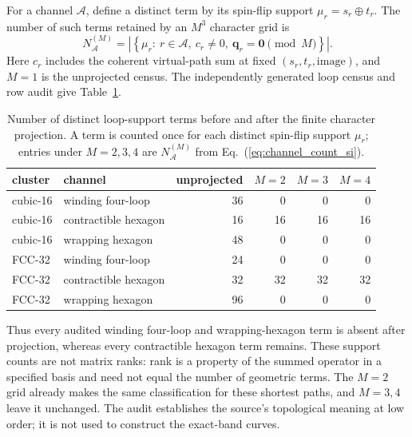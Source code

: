 \documentclass[aps,prl,onecolumn,amsmath,amssymb]{revtex4-2}
\newcommand{\bq}{\bm q}
\begin{document}
For a channel $\mathcal A$, define a distinct term by its spin-flip support
$\mu_r=s_r\mathbin\oplus t_r$.  The number of such terms retained by an
$M^3$ character grid is
\begin{equation}
 N_{\mathcal A}^{(M)}=
 \left|\left\{\mu_r:\ r\in\mathcal A,\ c_r\ne0,\
 \bq_r=\bm0\pmod M\right\}\right|.
\label{eq:channel_count_si}
\end{equation}
Here $c_r$ includes the coherent virtual-path sum at fixed
$(s_r,t_r,\text{image})$, and $M=1$ is the unprojected census.  The
independently generated loop census and row audit give
Table~\ref{tab:path_retention}.
\begin{table}[htbp]
\caption{Number of distinct loop-support terms before and after the finite
character projection.  A term is counted once for each distinct spin-flip
support $\mu_r$; entries under $M=2,3,4$ are $N_{\mathcal A}^{(M)}$ from
Eq.~(\ref{eq:channel_count_si}).}
\label{tab:path_retention}
\centering
\begin{tabular}{llrrrr}
\toprule
cluster & channel & unprojected & $M=2$ & $M=3$ & $M=4$\\
\midrule
cubic-16 & winding four-loop & 36 & 0 & 0 & 0\\
cubic-16 & contractible hexagon & 16 & 16 & 16 & 16\\
cubic-16 & wrapping hexagon & 48 & 0 & 0 & 0\\
FCC-32 & winding four-loop & 24 & 0 & 0 & 0\\
FCC-32 & contractible hexagon & 32 & 32 & 32 & 32\\
FCC-32 & wrapping hexagon & 96 & 0 & 0 & 0\\
\bottomrule
\end{tabular}
\end{table}
Thus every audited winding four-loop and wrapping-hexagon term is absent after
projection, whereas every contractible hexagon term remains.  These support
counts are not matrix ranks: rank is a property of the summed operator in a
specified basis and need not equal the number of geometric terms.  The $M=2$
grid already makes the same classification for these shortest paths, and
$M=3,4$ leave it unchanged.  The audit establishes the source's topological
meaning at low order; it is not used to construct the exact-band curves.
\end{document}
